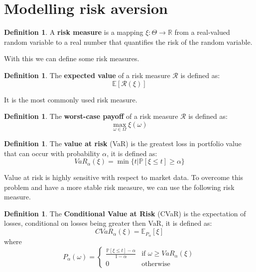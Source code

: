 \documentclass[12pt, openany]{report}
\theoremstyle{definition}
\newtheorem{definition}[thm]{Definition}
\begin{document}
\section{Modelling risk aversion}
\begin{definition}
    A \textbf{risk measure} is a mapping $\xi: \Theta \rightarrow \mathbb{R}$ from a real-valued random variable to a real number that quantifies the risk of the random variable. 
\end{definition}
With this we can define some risk measures.
\begin{definition}
    The \textbf{expected value} of a risk measure $\mathcal{R}$ is defined as:
    \begin{equation}
        \mathbb{E}[\mathcal{R}(\xi)]
    \end{equation}
\end{definition}
It is the most commonly used risk measure.
\begin{definition}
    The \textbf{worst-case payoff} of a risk measure $\mathcal{R}$ is defined as:
    \begin{equation}
        \max_{\omega \in \Omega} \xi(\omega)
    \end{equation}
\end{definition}
\begin{definition}
    The \textbf{value at risk} (VaR) is the greatest loss in portfolio value that can occur with probability $\alpha$, it is defined as:
    \begin{equation}
        VaR_\alpha(\xi) = \min \{ t | \mathbb{P}[\xi \leq t] \geq \alpha\}
    \end{equation}
\end{definition}
Value at risk is highly sensitive with respect to market data. To overcome this problem and have a more stable risk measure, we can use the following risk measure.
\begin{definition}
    The \textbf{Conditional Value at Risk} (CVaR) is the expectation of losses, conditional on losses being greater then VaR, it is defined as:
    \begin{equation}
        CVaR_\alpha(\xi) = \mathbb{E}_{P_{\alpha}}[\xi]
    \end{equation}
    where
    \begin{equation}
        P_{\alpha}(\omega) = \begin{cases} \frac{\mathbb{P}[\xi \leq t] - \alpha}{1-\alpha} & \text{if } \omega \geq VaR_\alpha(\xi) \\ 0 & \text{otherwise} \end{cases}
    \end{equation}
\end{definition}
\end{document}
